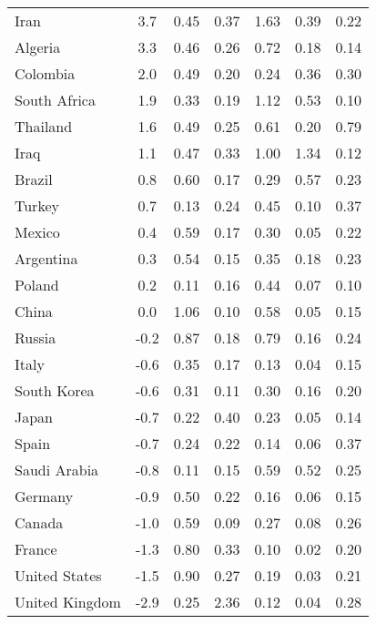 \begin{tabular}[t]{lcccccc}
Iran & 3.7 & 0.45 & 0.37 & 1.63 & 0.39 & 0.22\\
Algeria & 3.3 & 0.46 & 0.26 & 0.72 & 0.18 & 0.14\\
Colombia & 2.0 & 0.49 & 0.20 & 0.24 & 0.36 & 0.30\\
South Africa & 1.9 & 0.33 & 0.19 & 1.12 & 0.53 & 0.10\\
Thailand & 1.6 & 0.49 & 0.25 & 0.61 & 0.20 & 0.79\\
Iraq & 1.1 & 0.47 & 0.33 & 1.00 & 1.34 & 0.12\\
Brazil & 0.8 & 0.60 & 0.17 & 0.29 & 0.57 & 0.23\\
Turkey & 0.7 & 0.13 & 0.24 & 0.45 & 0.10 & 0.37\\
Mexico & 0.4 & 0.59 & 0.17 & 0.30 & 0.05 & 0.22\\
Argentina & 0.3 & 0.54 & 0.15 & 0.35 & 0.18 & 0.23\\
Poland & 0.2 & 0.11 & 0.16 & 0.44 & 0.07 & 0.10\\
China & 0.0 & 1.06 & 0.10 & 0.58 & 0.05 & 0.15\\
Russia & -0.2 & 0.87 & 0.18 & 0.79 & 0.16 & 0.24\\
Italy & -0.6 & 0.35 & 0.17 & 0.13 & 0.04 & 0.15\\
South Korea & -0.6 & 0.31 & 0.11 & 0.30 & 0.16 & 0.20\\
Japan & -0.7 & 0.22 & 0.40 & 0.23 & 0.05 & 0.14\\
Spain & -0.7 & 0.24 & 0.22 & 0.14 & 0.06 & 0.37\\
Saudi Arabia & -0.8 & 0.11 & 0.15 & 0.59 & 0.52 & 0.25\\
Germany & -0.9 & 0.50 & 0.22 & 0.16 & 0.06 & 0.15\\
Canada & -1.0 & 0.59 & 0.09 & 0.27 & 0.08 & 0.26\\
France & -1.3 & 0.80 & 0.33 & 0.10 & 0.02 & 0.20\\
United States & -1.5 & 0.90 & 0.27 & 0.19 & 0.03 & 0.21\\
United Kingdom & -2.9 & 0.25 & 2.36 & 0.12 & 0.04 & 0.28\\
\bottomrule
\end{tabular}